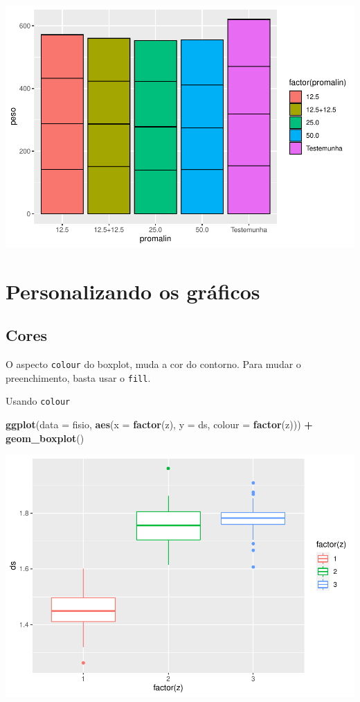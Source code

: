 \documentclass[
]{book}
\newenvironment{Shaded}{\begin{snugshade}}{\end{snugshade}}
\newcommand{\DataTypeTok}[1]{\textcolor[rgb]{0.13,0.29,0.53}{#1}}
\newcommand{\KeywordTok}[1]{\textcolor[rgb]{0.13,0.29,0.53}{\textbf{#1}}}
\newcommand{\NormalTok}[1]{#1}
\newcommand{\OperatorTok}[1]{\textcolor[rgb]{0.81,0.36,0.00}{\textbf{#1}}}
\newcommand{\StringTok}[1]{\textcolor[rgb]{0.31,0.60,0.02}{#1}}
\begin{document}
\includegraphics{TudodoR_files/figure-latex/unnamed-chunk-199-1.pdf}

\hypertarget{personalizando-os-gruxe1ficos-1}{%
\section{Personalizando os gráficos}\label{personalizando-os-gruxe1ficos-1}}

\hypertarget{cores-1}{%
\subsection{Cores}\label{cores-1}}

O aspecto \texttt{colour} do boxplot, muda a cor do contorno. Para mudar o preenchimento, basta usar o \texttt{fill}.

Usando \texttt{colour}

\begin{Shaded}
\begin{Highlighting}[]
\KeywordTok{ggplot}\NormalTok{(}\DataTypeTok{data =}\NormalTok{ fisio, }\KeywordTok{aes}\NormalTok{(}\DataTypeTok{x =} \KeywordTok{factor}\NormalTok{(z), }\DataTypeTok{y =}\NormalTok{ ds, }\DataTypeTok{colour =} \KeywordTok{factor}\NormalTok{(z))) }\OperatorTok{+}
\StringTok{  }\KeywordTok{geom_boxplot}\NormalTok{()}
\end{Highlighting}
\end{Shaded}

\includegraphics{TudodoR_files/figure-latex/unnamed-chunk-200-1.pdf}
\end{document}
